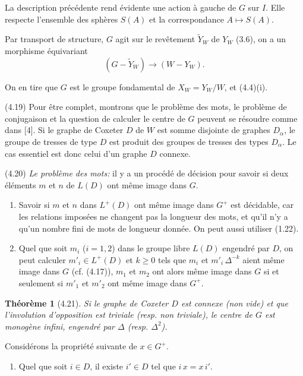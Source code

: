 \documentclass[12pt]{article}
\newtheorem{theoreme}{Théorème}
\theoremstyle{remark}
\begin{document}
La description précédente rend évidente une action à gauche de $G$ sur $I$. Elle respecte l'ensemble des sphères $S(A)$ et la correspondance $A \mapsto S(A)$.

Par transport de structure, $G$ agit sur le revêtement $\tilde{Y}_W$ de $Y_W$ (3.6), on a un morphisme équivariant
\[(G - \tilde{Y}_W) \to (W - Y_W).\]

On en tire que $G$ est le groupe fondamental de $X_W = Y_W/W$, et (4.4)(i).

(4.19) Pour être complet, montrons que le problème des mots, le problème de conjugaison et la question de calculer le centre de $G$ peuvent se résoudre comme dans [4]. Si le graphe de Coxeter $D$ de $W$ est somme disjointe de graphes $D_\alpha$, le groupe de tresses de type $D$ est produit des groupes de tresses des types $D_\alpha$. Le cas essentiel est donc celui d'un graphe $D$ connexe.

(4.20) \emph{Le problème des mots:} il y a un procédé de décision pour savoir si deux éléments $m$ et $n$ de $L(D)$ ont même image dans $G$.

\begin{enumerate}
\item[a)] Savoir si $m$ et $n$ dans $L^+(D)$ ont même image dans $G^+$ est décidable, car les relations imposées ne changent pas la longueur des mots, et qu'il n'y a qu'un nombre fini de mots de longueur donnée. On peut aussi utiliser (1.22).
\item[b)] Quel que soit $m_i$ ($i = 1, 2$) dans le groupe libre $L(D)$ engendré par $D$, on peut calculer $m'_i \in L^+(D)$ et $k \geq 0$ tels que $m_i$ et $m'_i \, \Delta^{-k}$ aient même image dans $G$ (cf. (4.17)), $m_1$ et $m_2$ ont alors même image dans $G$ si et seulement si $m'_1$ et $m'_2$ ont même image dans $G^+$.
\end{enumerate}

\begin{theoreme}[4.21]
Si le graphe de Coxeter $D$ est connexe (non vide) et que l'involution d'opposition est triviale (resp. non triviale), le centre de $G$ est monogène infini, engendré par $\Delta$ (resp. $\Delta^2$).
\end{theoreme}

Considérons la propriété suivante de $x \in G^+$.
\begin{enumerate}
\item[(*)] Quel que soit $i \in D$, il existe $i' \in D$ tel que $i \, x = x \, i'$.
\end{enumerate}
\end{document}
